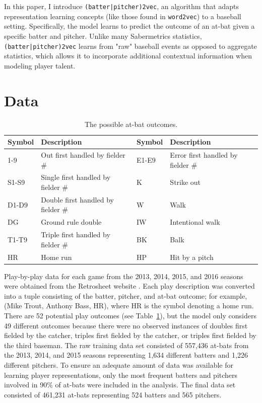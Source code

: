 \documentclass{article}
\begin{document}
In this paper, I introduce \texttt{(batter|pitcher)2vec}, an algorithm that adapts representation learning concepts (like those found in \texttt{word2vec}) to a baseball setting. Specifically, the model learns to predict the outcome of an at-bat given a specific batter and pitcher. Unlike many Sabermetrics statistics, \texttt{(batter|pitcher)2vec} learns from "raw" baseball events as opposed to aggregate statistics, which allows it to incorporate additional contextual information when modeling player talent.

\section{Data}
\label{data}

\begin{table}[h]
\caption{The possible at-bat outcomes.}
\centering
\begin{adjustbox}{max width=\textwidth}
    \begin{tabular}{ | l | l | l | l | }
    \hline
    Symbol & Description & Symbol & Description \\ 
    \hline\hline
    1-9 & Out first handled by fielder \# & E1-E9 & Error first handled by fielder \# \\
    \hline
    S1-S9 & Single first handled by fielder \# & K & Strike out \\
    \hline
    D1-D9 & Double first handled by fielder \# & W & Walk \\
    \hline
    DG & Ground rule double & IW & Intentional walk \\
    \hline
    T1-T9 & Triple first handled by fielder \# & BK & Balk \\
    \hline
    HR & Home run & HP & Hit by a pitch \\
    \hline
    \end{tabular}
\end{adjustbox}
\label{table:at_bats}
\end{table}

Play-by-play data for each game from the 2013, 2014, 2015, and 2016 seasons were obtained from the Retrosheet website \parencite{Retro}. Each play description was converted into a tuple consisting of the batter, pitcher, and at-bat outcome; for example, (Mike Trout, Anthony Bass, HR), where HR is the symbol denoting a home run. There are 52 potential play outcomes (see Table~\ref{table:at_bats}), but the model only considers 49 different outcomes because there were no observed instances of doubles first fielded by the catcher, triples first fielded by the catcher, or triples first fielded by the third baseman. The raw training data set consisted of 557,436 at-bats from the 2013, 2014, and 2015 seasons representing 1,634 different batters and 1,226 different pitchers. To ensure an adequate amount of data was available for learning player representations, only the most frequent batters and pitchers involved in 90\% of at-bats were included in the analysis. The final data set consisted of 461,231 at-bats representing 524 batters and 565 pitchers.
\end{document}
